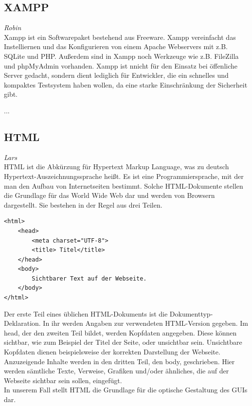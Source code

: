 \documentclass[12pt,a4paper,bibliography=totocnumbered,listof=totocnumbered]{scrartcl}
\begin{document}
\subsection{XAMPP}
\label{sec:XAMPP}
\emph{Robin}\\
Xampp ist ein Softwarepaket bestehend aus Freeware. Xampp vereinfacht das Instelliernen und das Konfigurieren von einem Apache Webservers mit z.B. SQLite und PHP. Außerdem sind in Xampp noch Werkzeuge wie z.B. FileZilla und phpMyAdmin vorhanden. Xampp ist nnicht für den Einsatz bei öffenliche Server gedacht, sondern dient lediglich für Entwickler, die ein schnelles und kompaktes Testsystem haben wollen, da eine starke Einschränkung der Sicherheit gibt.\cite{XAMPP}

...

\subsection{HTML}
\label{sec:HTML}
\emph{Lars}\\
HTML ist die Abkürzung für \glqq Hypertext Markup Language\grqq, was zu deutsch \glqq Hypertext-Auszeichnungssprache\grqq{} heißt. Es ist eine Programmiersprache, mit der man den Aufbau von Internetseiten bestimmt. Solche HTML-Dokumente stellen die Grundlage für das World Wide Web dar und werden von Browsern dargestellt.\cite{HTML}\cite{Hypertext_Markup_Language} Sie bestehen in der Regel aus drei Teilen.\cite{HTML/Dokumentstruktur_und_Aufbau} 

\vspace{1em}
\begin{lstlisting}[caption= Beispiel für ein einfaches HTML-Dokument, label=lst:HTML]
<html>
	<head>
		<meta charset="UTF-8">		
		<title> Titel</title>
	</head>
	<body>
		Sichtbarer Text auf der Webseite.
	</body>
</html>
\end{lstlisting}

Der erste Teil eines üblichen HTML-Dokuments ist die Dokumenttyp-Deklaration. In ihr werden Angaben zur verwendeten HTML-Version gegeben. Im \glqq head\grqq , der den zweiten Teil bildet, werden  Kopfdaten angegeben. Diese können sichtbar, wie zum Beispiel der Titel der Seite, oder unsichtbar sein. Unsichtbare Kopfdaten dienen beispielsweise der korrekten Darstellung der Webseite.\cite{HTML/Kopfdaten} Anzuzeigende Inhalte werden in den dritten Teil,  den \glqq body\grqq , geschrieben. Hier werden sämtliche Texte, Verweise, Grafiken und/oder ähnliches, die auf der Webseite sichtbar sein sollen, eingefügt.\cite{HTML/Dokumentstruktur_und_Aufbau} \\
In unserem Fall stellt HTML die Grundlage für die optische Gestaltung des GUIs dar.
\end{document}
